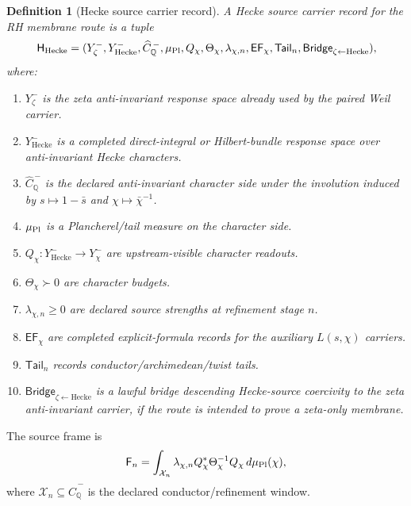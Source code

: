 \documentclass[11pt]{article}
\newtheorem{definition}{Definition}
\newcommand{\F}{\mathsf F}
\newcommand{\Hecke}{\mathrm{Hecke}}
\newcommand{\Zeta}{\zeta}
\begin{document}
\begin{definition}[Hecke source carrier record]
A Hecke source carrier record for the RH membrane route is a tuple
\begin{equation}
  \mathsf H_{\Hecke}
  =(Y^-_{\Zeta},Y^-_{\Hecke},\widehat C_{\mathbb Q}^{\,-},\mu_{\rm Pl},Q_\chi,
  \Theta_\chi,\lambda_{\chi,n},\mathsf{EF}_\chi,\mathsf{Tail}_n,\mathsf{Bridge}_{\Zeta\leftarrow\Hecke}),
\end{equation}
where:
\begin{enumerate}[label=(\roman*)]
\item \(Y^-_{\Zeta}\) is the zeta anti-invariant response space already used by the paired Weil carrier.
\item \(Y^-_{\Hecke}\) is a completed direct-integral or Hilbert-bundle response space over anti-invariant Hecke characters.
\item \(\widehat C_{\mathbb Q}^{\,-}\) is the declared anti-invariant character side under the involution induced by \(s\mapsto 1-\bar s\) and \(\chi\mapsto \bar\chi^{-1}\).
\item \(\mu_{\rm Pl}
\) is a Plancherel/tail measure on the character side.
\item \(Q_\chi:Y^-_{\Hecke}\to Y^-_\chi\) are upstream-visible character readouts.
\item \(\Theta_\chi\succ0\) are character budgets.
\item \(\lambda_{\chi,n}\ge0\) are declared source strengths at refinement stage \(n\).
\item \(\mathsf{EF}_\chi\) are completed explicit-formula records for the auxiliary \(L(s,\chi)\) carriers.
\item \(\mathsf{Tail}_n\) records conductor/archimedean/twist tails.
\item \(\mathsf{Bridge}_{\Zeta\leftarrow\Hecke}\) is a lawful bridge descending Hecke-source coercivity to the zeta anti-invariant carrier, if the route is intended to prove a zeta-only membrane.
\end{enumerate}
\end{definition}

The source frame is
\begin{equation}
  \F_n
  =\int_{\mathcal X_n}\lambda_{\chi,n}Q_\chi^*\Theta_\chi^{-1}Q_\chi\,d\mu_{\rm Pl}(\chi),
\end{equation}
where \(\mathcal X_n\subseteq \widehat C_{\mathbb Q}^{\,-}\) is the declared conductor/refinement window.
\end{document}
